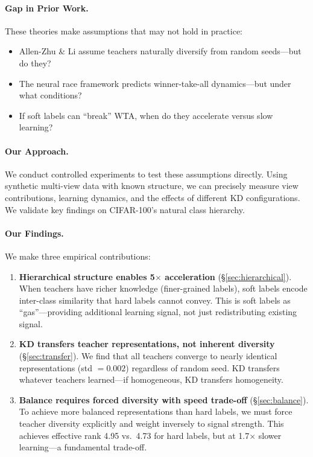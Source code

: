 \documentclass{article}
\begin{document}
\paragraph{Gap in Prior Work.} These theories make assumptions that may not hold in practice:
\begin{itemize}
    \item Allen-Zhu \& Li assume teachers naturally diversify from random seeds---but do they?
    \item The neural race framework predicts winner-take-all dynamics---but under what conditions?
    \item If soft labels can ``break'' WTA, when do they accelerate versus slow learning?
\end{itemize}

\paragraph{Our Approach.} We conduct controlled experiments to test these assumptions directly. Using synthetic multi-view data with known structure, we can precisely measure view contributions, learning dynamics, and the effects of different KD configurations. We validate key findings on CIFAR-100's natural class hierarchy.

\paragraph{Our Findings.} We make three empirical contributions:

\begin{enumerate}
    \item \textbf{Hierarchical structure enables 5$\times$ acceleration} (\S\ref{sec:hierarchical}). When teachers have richer knowledge (finer-grained labels), soft labels encode inter-class similarity that hard labels cannot convey. This is soft labels as ``gas''---providing additional learning signal, not just redistributing existing signal.

    \item \textbf{KD transfers teacher representations, not inherent diversity} (\S\ref{sec:transfer}). We find that all teachers converge to nearly identical representations (std $= 0.002$) regardless of random seed. KD transfers whatever teachers learned---if homogeneous, KD transfers homogeneity.

    \item \textbf{Balance requires forced diversity with speed trade-off} (\S\ref{sec:balance}). To achieve more balanced representations than hard labels, we must force teacher diversity explicitly and weight inversely to signal strength. This achieves effective rank 4.95 vs.\ 4.73 for hard labels, but at 1.7$\times$ slower learning---a fundamental trade-off.
\end{enumerate}
\end{document}
